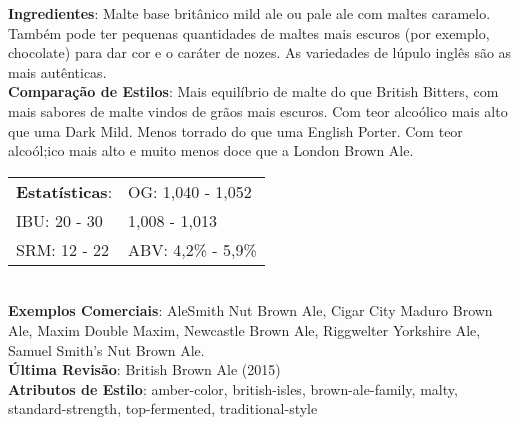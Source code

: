 \textbf{Ingredientes}: Malte base britânico mild ale ou pale ale com maltes caramelo. Também pode ter pequenas quantidades de maltes mais escuros (por exemplo, chocolate) para dar cor e o caráter de nozes. As variedades de lúpulo inglês são as mais autênticas. \\
\textbf{Comparação de Estilos}: Mais equilíbrio de malte do que British Bitters, com mais sabores de malte vindos de grãos mais escuros. Com teor alcoólico mais alto que uma Dark Mild. Menos torrado do que uma English Porter. Com teor alcoól;ico mais alto e muito menos doce que a London Brown Ale. \\
\begin{tabular}{@{}p{35mm}p{35mm}@{}}
  \textbf{Estatísticas}: & OG: 1,040 - 1,052 \\
  IBU: 20 - 30  & 1,008 - 1,013  \\
  SRM: 12 - 22  & ABV: 4,2\% - 5,9\%
\end{tabular}\\
\textbf{Exemplos Comerciais}: AleSmith Nut Brown Ale, Cigar City Maduro Brown Ale, Maxim Double Maxim, Newcastle Brown Ale, Riggwelter Yorkshire Ale, Samuel Smith’s Nut Brown Ale. \\
\textbf{Última Revisão}: British Brown Ale (2015) \\
\textbf{Atributos de Estilo}: amber-color, british-isles, brown-ale-family, malty, standard-strength, top-fermented, traditional-style
